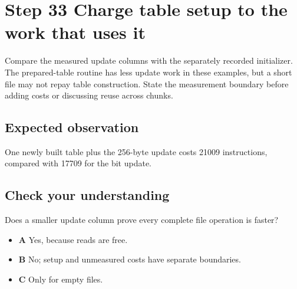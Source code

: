 \section{Step 33 Charge table setup to the work that uses it}\label{crc-s33}

Compare the measured update columns with the separately recorded initializer. The prepared-table routine has less update work in these examples, but a short file may not repay table construction. State the measurement boundary before adding costs or discussing reuse across chunks.

\subsection{Expected observation}
One newly built table plus the 256-byte update costs 21009 instructions, compared with 17709 for the bit update.

\subsection{Check your understanding}
Does a smaller update column prove every complete file operation is faster?

\begin{itemize}
  \item \textbf{A} Yes, because reads are free.
  \item \textbf{B} No; setup and unmeasured costs have separate boundaries.
  \item \textbf{C} Only for empty files.
\end{itemize}
